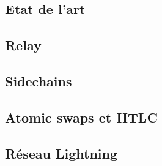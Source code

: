 \subsection{Etat de l'art}


\subsection[Relay]{Relay}


\subsection[Relay]{Sidechains}


\subsection[Atomic swaps et HTLC]{Atomic swaps et HTLC}


\subsection[Réseau Lightning]{Réseau Lightning}
